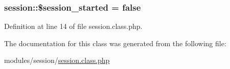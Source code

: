 \hypertarget{classsession_aae3391920555707a71e14e15f2929825}{
\subsubsection[{\$session\-\_\-started}]{\setlength{\rightskip}{0pt plus 5cm}session\-::\$session\-\_\-started = false}}\label{classsession_aae3391920555707a71e14e15f2929825}


Definition at line 14 of file session.\-class.\-php.



The documentation for this class was generated from the following file\-:\begin{DoxyCompactItemize}
\item 
modules/session/\hyperlink{session_8class_8php}{session.\-class.\-php}\end{DoxyCompactItemize}
